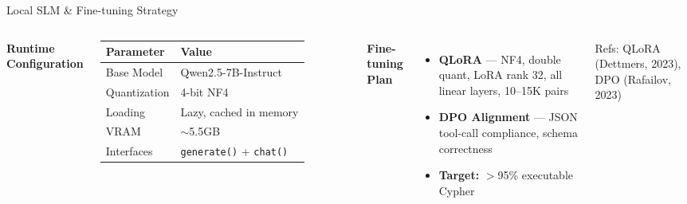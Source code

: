 \documentclass[aspectratio=169]{beamer}
\begin{document}
\begin{frame}{Local SLM \& Fine-tuning Strategy}
\begin{columns}[T]
\textbf{Runtime Configuration}
\vspace{4pt}
\begin{tabular}{ll}
\toprule
Parameter & Value \\
\midrule
Base Model & Qwen2.5-7B-Instruct \\
Quantization & 4-bit NF4 \\
Loading & Lazy, cached in memory \\
VRAM & $\sim$5.5GB \\
Interfaces & \texttt{generate()} + \texttt{chat()} \\
\bottomrule
\end{tabular}

\textbf{Fine-tuning Plan}
\begin{itemize}
  \item \textbf{QLoRA} --- NF4, double quant, LoRA rank 32, all linear layers, 10--15K pairs
  \item \textbf{DPO Alignment} --- JSON tool-call compliance, schema correctness
  \item \textbf{Target:} $>$95\% executable Cypher
\end{itemize}
\vspace{0.3em}
\small Refs: QLoRA (Dettmers, 2023), DPO (Rafailov, 2023)
\end{columns}
\end{frame}
\end{document}
